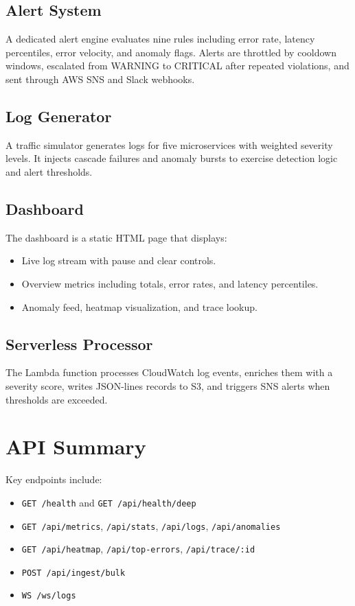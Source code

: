 \documentclass[11pt,a4paper]{article}
\begin{document}
\subsection{Alert System}
A dedicated alert engine evaluates nine rules including error rate, latency percentiles, error velocity, and anomaly flags. Alerts are throttled by cooldown windows, escalated from WARNING to CRITICAL after repeated violations, and sent through AWS SNS and Slack webhooks.

\subsection{Log Generator}
A traffic simulator generates logs for five microservices with weighted severity levels. It injects cascade failures and anomaly bursts to exercise detection logic and alert thresholds.

\subsection{Dashboard}
The dashboard is a static HTML page that displays:
\begin{itemize}
  \item Live log stream with pause and clear controls.
  \item Overview metrics including totals, error rates, and latency percentiles.
  \item Anomaly feed, heatmap visualization, and trace lookup.
\end{itemize}

\subsection{Serverless Processor}
The Lambda function processes CloudWatch log events, enriches them with a severity score, writes JSON-lines records to S3, and triggers SNS alerts when thresholds are exceeded.

\section{API Summary}
Key endpoints include:
\begin{itemize}
  \item \texttt{GET /health} and \texttt{GET /api/health/deep}
  \item \texttt{GET /api/metrics}, \texttt{/api/stats}, \texttt{/api/logs}, \texttt{/api/anomalies}
  \item \texttt{GET /api/heatmap}, \texttt{/api/top-errors}, \texttt{/api/trace/:id}
  \item \texttt{POST /api/ingest/bulk}
  \item \texttt{WS /ws/logs}
\end{itemize}
\end{document}
